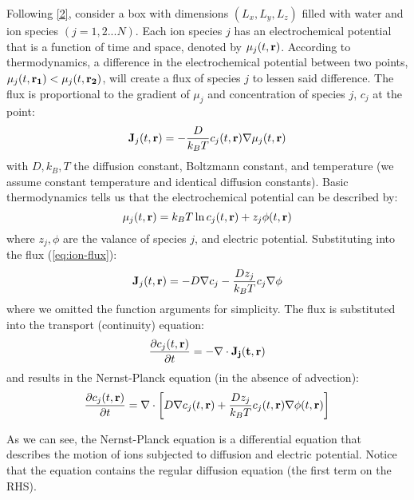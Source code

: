 \documentclass[12pt]{article}
\begin{document}
Following \hyperref[c:2]{[2]}, consider a box with dimensions $(L_x, L_y, L_z)$ filled with water and ion species $(j=1,2...N)$. Each ion species $j$ has an electrochemical potential that is a function of time and space, denoted by $\mu_j (t, \bf{r})$. According to thermodynamics, a  difference in the electrochemical potential between two points, $\mu_j (t, {\bf r_1}) < \mu_j (t, {\bf r_2})$, will create a flux of species $j$ to lessen said difference. The flux is proportional to the gradient of $\mu_j$ and concentration of species $j$, $c_j$ at the point:
\begin{equation} \label{eq:ion-flux}
    {\bf J}_j (t, {\bf r}) = -\frac{D}{k_B T} c_j(t, {\bf r}) \nabla \mu_j(t, {\bf r})  
\end{equation}
with $D, k_B, T$ the diffusion constant, Boltzmann constant, and temperature (we assume constant temperature and identical diffusion constants). 
Basic thermodynamics tells us that the electrochemical potential can be described by:
\begin{equation}
    \mu_j(t, {\bf r}) = k_B T \ln c_j (t, {\bf r}) + z_j \phi (t, {\bf r})    
\end{equation}
where $z_j, \phi$ are the valance of species $j$, and electric potential. Substituting into the flux (\ref{eq:ion-flux}):
\begin{equation}
    {\bf J}_j (t, {\bf r}) = -D \nabla c_j -\frac{Dz_j}{k_BT} c_j\nabla \phi    
\end{equation}
where we omitted the function arguments for simplicity. 
The flux is substituted into the transport (continuity) equation:
\begin{equation} \label{eq:continuity}
    \frac{\partial c_j (t, {\bf r})}{\partial t} = -\nabla \cdot \bf{J_j}(t, {\bf r})    
\end{equation}
and results in the Nernst-Planck equation (in the absence of advection):
\begin{equation} \label{eq:nernst-planck}
\frac{\partial c_j (t, {\bf r})}{\partial t} = \nabla \cdot \left[ D \nabla c_j(t, {\bf r}) +\frac{Dz_j}{k_BT} c_j(t, {\bf r}) \nabla \phi (t, {\bf r}) \right]
\end{equation}

As we can see, the Nernst-Planck equation is a differential equation that describes the motion of ions 
subjected to diffusion and electric potential. Notice that the equation contains the regular diffusion equation (the first term on the RHS).
\end{document}
